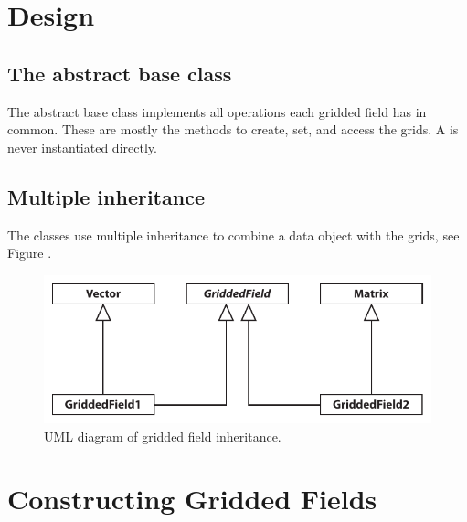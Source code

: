 \section{Design}



\subsection{The abstract base class }

The abstract base class  implements all operations each gridded field has in common. These are mostly the methods to create, set, and access the grids. A  is never instantiated directly.


\subsection{Multiple inheritance}

The  classes use multiple inheritance to combine a data object with the grids, see Figure .

\begin{figure}[ht!]
\begin{center}
\includegraphics{Figs/development/griddedfields_inheritance}
\caption{UML diagram of gridded field inheritance.}
\end{center}
\end{figure}


\section{Constructing Gridded Fields}


